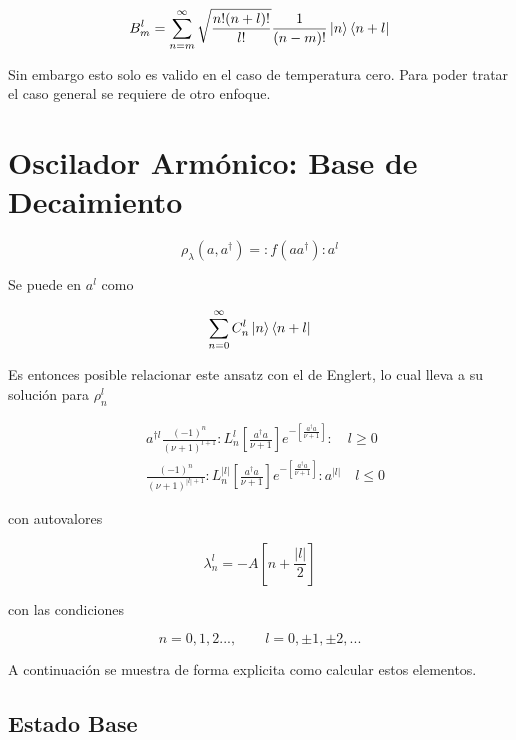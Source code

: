 \documentclass[a4paper,10pt]{report}
\begin{document}
\begin{equation}
B_m^l = \sum_{n=m}^\infty \sqrt{\frac{n!(n+l)!}{l!}}\frac{1}{(n-m)!}\Ket{n}\Bra{n+l}
\end{equation}

Sin embargo esto solo es valido en el caso de temperatura cero. Para poder tratar el caso general se requiere de otro enfoque.

\section{Oscilador Armónico: Base de Decaimiento}




\begin{equation}\label{Englert1993}
\rho_\lambda (a,a^\dagger) = :f(aa^\dagger):a^l
\end{equation}

Se puede en $a^l$ como

\begin{equation}
\sum_{n=0}^\infty C_n^l\Ket{n}\Bra{n+l}
\end{equation}

Es entonces posible relacionar este ansatz con el de Englert, lo cual lleva a su solución para $\rho_n^l$

\begin{align}\label{DefDB}
&a^{\dagger l}\frac{(-1)^n}{(\nu+1)^{l+1}}:L_n^l[\frac{a^\dagger a}{\nu+1}]e^{-[\frac{a^\dagger a}{\nu+1}]}:\quad l \geq 0 \\
&\frac{(-1)^n}{(\nu+1)^{|l|+1}}:L_n^{|l|}[\frac{a^\dagger a}{\nu+1}]e^{-[\frac{a^\dagger a}{\nu+1}]}:a^{|l|}\quad l \leq 0
\end{align}

con autovalores

\begin{equation}
\lambda_n^l = -A[n + \frac{|l|}{2}]
\end{equation}

con las condiciones

\begin{equation}
n=0,1,2...,\qquad l = 0,\pm 1, \pm 2,... 
\end{equation}

A continuación se muestra de forma explicita como calcular estos elementos. 

\subsection{Estado Base}
\end{document}
